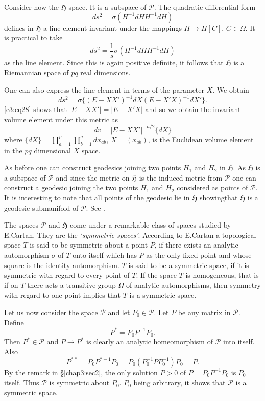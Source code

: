 Consider now the $\mathfrak{H}$ space. It is a subspace of
$\mathscr{P}$. The quadratic differential form
$$
ds^{2}=\sigma(H^{-1}dHH^{-1}dH)
$$
defines in $\mathfrak{H}$ a line element invariant under the mappings
$H\to H[C]$, $C\in\Omega$. It is practical to take 
$$
ds^{2}=\frac{1}{s}\sigma(H^{-1}dHH^{-1}dH)
$$
as the line element. Since this is again positive definite, it follows
that $\mathfrak{H}$ is a Riemannian space of $pq$ real dimensions.

One can also express the line element in terms of the parameter
$X$. We obtain
$$
ds^{2}=\sigma\{(E-XX')^{-1}dX(E-X'X)^{-1}dX'\}.
$$
\eqref{c3:eq28} shows that $|E-XX'|=|E-X'X|$ and so we obtain the invariant
volume element under this metric as
$$
dv=|E-XX'|^{-n/2}\{dX\}
$$
where $\{dX\}=\prod\limits^{p}_{a=1}\prod\limits^{q}_{b=1}dx_{ab}$,
$X=(x_{ab})$, is the Euclidean volume element in the $pq$ dimensional
$X$ space.

As before one can construct geodesics joining two points $H_{1}$ and
$H_{2}$ in $\mathfrak{H}$. As $\mathfrak{H}$ is a subspace of
$\mathscr{P}$ and since the metric on $\mathfrak{H}$ is the induced
metric from $\mathscr{P}$ one can construct a geodesic joining the two
points $H_{1}$ and $H_{2}$ considered as points of $\mathscr{P}$. It
is interesting to note that all points of the geodesic lie in
$\mathfrak{H}$ showing\pageoriginale that $\mathfrak{H}$ is a geodesic
submanifold of $\mathscr{P}$. See \cite{c3:key7}.

The spaces $\mathscr{P}$ and $\mathfrak{H}$ come under a remarkable
class of spaces studied by E.\@ Cartan. They are the {\em `symmetric
  spaces'}. According to E.\@ Cartan a topological space $T$ is said
to be symmetric about a point $P$, if there exists an analytic
automorphism $\sigma$ of $T$ onto itself which has $P$ as the only
fixed point and whose square is the identity automorphism. $T$ is said
to be a symmetric space, if it is symmetric with regard to every point
of $T$. If the space $T$ is homogeneous, that is if on $T$ there acts
a transitive group $\Omega$ of analytic automorphisms, then symmetry
with regard to one point implies that $T$ is a symmetric space.

Let us now consider the space $\mathscr{P}$ and let
$P_{0}\in\mathscr{P}$. Let $P$ be any matrix in $\mathscr{P}$. Define
$$
P^{\ast}=P_{0}P^{-1}P_{0}.
$$
Then $P^{\ast}\in\mathscr{P}$ and $P\to P^{\ast}$ is clearly an
analytic homeomorphism of $\mathscr{P}$ into itself. Also
$$
P^{\ast\ast}=P_{0}P^{\ast-1}P_{0}=P_{0}(P^{-1}_{0}PP^{-1}_{0})P_{0}=P.
$$
By the remark in \S \ref{chap3:sec2}, the only solution $P>0$ of
$P=P_{0}P^{-1}P_{0}$ is $P_{0}$ itself. Thus $\mathscr{P}$ is
symmetric about $P_{0}$. $P_{0}$ being arbitrary, it shows that
$\mathscr{P}$ is a symmetric space.

